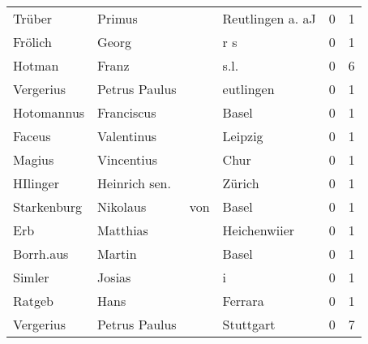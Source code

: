 \begin{tabular}{llllrr}
                   Trüber &                             Primus &             &                            Reutlingen a. aJ &          0 &         1 \\
                  Frölich &                              Georg &             &                                         r s &          0 &         1 \\
                   Hotman &                              Franz &             &                                        s.l. &          0 &         6 \\
                Vergerius &                      Petrus Paulus &             &                                   eutlingen &          0 &         1 \\
               Hotomannus &                         Franciscus &             &                                       Basel &          0 &         1 \\
                   Faceus &                         Valentinus &             &                                     Leipzig &          0 &         1 \\
                   Magius &                         Vincentius &             &                                        Chur &          0 &         1 \\
                 HIlinger &                      Heinrich sen. &             &                                      Zürich &          0 &         1 \\
              Starkenburg &                           Nikolaus &         von &                                       Basel &          0 &         1 \\
                      Erb &                           Matthias &             &                                Heichenwiier &          0 &         1 \\
                Borrh.aus &                             Martin &             &                                       Basel &          0 &         1 \\
                   Simler &                             Josias &             &                                           i &          0 &         1 \\
                   Ratgeb &                               Hans &             &                                     Ferrara &          0 &         1 \\
                Vergerius &                      Petrus Paulus &             &                                   Stuttgart &          0 &         7 \\

\end{tabular}
